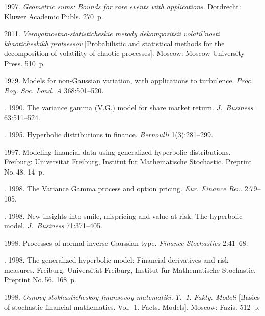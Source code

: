 \begin{multicols}{2}
{{\begin{thebibliography}{99}
 1997. \textit{Geometric sums: Bounds for 
rare events with applications}. {Dordrecht: Kluwer Academic Publs}. 270~p.

  2011.
\textit{Veroyatnostno-statisticheskie metody dekompozitsii volatil'nosti 
khaoticheskikh protsessov}
[Probabilistic and statistical methods for the decomposition of volatility of 
chaotic processes].
Moscow: Moscow University Press. 510~p.

  1979. 
Models for non-Gaussian variation,
with applications to turbulence. \textit{Proc. Roy. Soc. Lond. A} 368:501--520.

 . 1990. 
The variance gamma $($V.G.$)$ model
for share market return. \textit{J.~Business} 63:511--524.

 . 1995. 
Hyperbolic distributions in finance. \textit{Bernoulli} 1(3):281--299.

 1997. Modeling financial data using generalized hyperbolic
distributions. 
{Freiburg: Universit$\ddot{\mbox{a}}$t Freiburg, Institut f$\ddot{\mbox{u}}$r 
Mathematische Stochastic}. Preprint No.\,48. 14~p.

. 1998. The Variance Gamma
process and option pricing. \textit{Eur. Finance Rev.} 2:79--105.

. 1998. New insights into smile,
mispricing and value at risk: The hyperbolic model. \textit{J.~Business} 71:371--405.

 1998. Processes of normal inverse Gaussian
type. \textit{Finance Stochastics} 2:41--68.

. 1998. The generalized hyperbolic model:
Financial derivatives and risk measures. 
{Freiburg: Universit$\ddot{\mbox{a}}$t Freiburg, Institut f$\ddot{\mbox{u}}$r 
Mathematische Stochastic}. Preprint No.\,56. 168~p.

 1998. \textit{Osnovy stokhasticheskoy finansovoy matematiki. Т.~1. 
Fakty. Modeli}
[Basics of stochastic financial mathematics. Vol.~1. Facts. Models]. 
{Moscow: Fazis}. 512~p.


\end{thebibliography}}}
\end{multicols}
